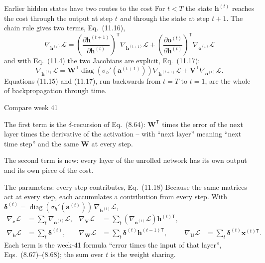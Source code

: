 \documentclass[10pt,aspectratio=169]{beamer}
\begin{document}
\begin{frame}{Earlier hidden states have two routes to the cost}
For $t<T$ the state $\bm{h}^{(t)}$ reaches the cost through the output at
step $t$ \emph{and} through the state at step $t+1$.  The chain rule gives
two terms, Eq.~(11.16),
\[
  \boxed{\;
  \nabla_{\bm{h}^{(t)}}\mathcal{L}
  =\left(\frac{\partial\bm{h}^{(t+1)}}{\partial\bm{h}^{(t)}}\right)^{\!\mathsf{T}}
   \nabla_{\bm{h}^{(t+1)}}\mathcal{L}
  +\left(\frac{\partial\bm{o}^{(t)}}{\partial\bm{h}^{(t)}}\right)^{\!\mathsf{T}}
   \nabla_{\bm{o}^{(t)}}\mathcal{L}\;}
\]
and with Eq.~(11.4) the two Jacobians are explicit, Eq.~(11.17):
\[
  \nabla_{\bm{h}^{(t)}}\mathcal{L}
  =\bm{W}^{\mathsf{T}}\operatorname{diag}\!\left(\sigma_h'(\bm{a}^{(t+1)})\right)
   \nabla_{\bm{h}^{(t+1)}}\mathcal{L}
  +\bm{V}^{\mathsf{T}}\nabla_{\bm{o}^{(t)}}\mathcal{L}.
\]
Equations (11.15) and (11.17), run backwards from $t=T$ to $t=1$, are the
whole of backpropagation through time.
\end{frame}

\begin{frame}{Compare week 41}
\begin{block}{The first term}
is the $\delta$-recursion of Eq.~(8.64): $\bm{W}^{\mathsf{T}}$ times the
error of the next layer times the derivative of the activation -- with
``next layer'' meaning ``next time step'' and the same $\bm{W}$ at every
step.
\end{block}
\begin{block}{The second term}
is new: every layer of the unrolled network has its own output and its own
piece of the cost.
\end{block}
\end{frame}

\begin{frame}{The parameters: every step contributes, Eq.~(11.18)}
Because the same matrices act at every step, each accumulates a contribution
from every step.  With
$\bm{\delta}^{(t)}=\operatorname{diag}(\sigma_h'(\bm{a}^{(t)}))\,\nabla_{\bm{h}^{(t)}}\mathcal{L}$,
\[
\begin{aligned}
  \nabla_{\bm{c}}\mathcal{L}&=\sum_t\nabla_{\bm{o}^{(t)}}\mathcal{L}, &
  \nabla_{\bm{V}}\mathcal{L}&=\sum_t\left(\nabla_{\bm{o}^{(t)}}\mathcal{L}\right)\bm{h}^{(t)\mathsf{T}},\\
  \nabla_{\bm{b}}\mathcal{L}&=\sum_t\bm{\delta}^{(t)}, &
  \nabla_{\bm{W}}\mathcal{L}&=\sum_t\bm{\delta}^{(t)}\bm{h}^{(t-1)\mathsf{T}}, &
  \nabla_{\bm{U}}\mathcal{L}&=\sum_t\bm{\delta}^{(t)}\bm{x}^{(t)\mathsf{T}}.
\end{aligned}
\]
Each term is the week-41 formula ``error times the input of that layer'',
Eqs.~(8.67)--(8.68); the sum over $t$ is the weight sharing.
\end{frame}
\end{document}
